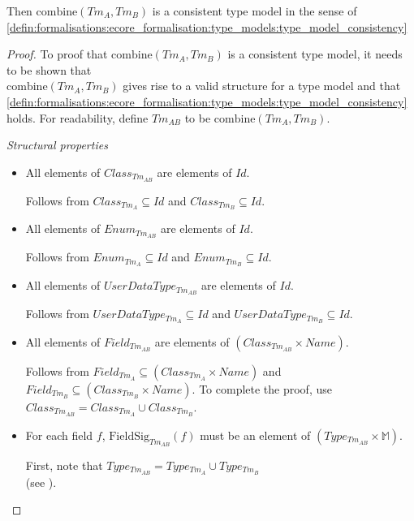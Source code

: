 \begin{thm}
Then $\mathrm{combine}(Tm_A, Tm_B)$ is a consistent type model in the sense of \cref{defin:formalisations:ecore_formalisation:type_models:type_model_consistency}
\end{thm}

\begin{proof}
To proof that $\mathrm{combine}(Tm_A, Tm_B)$ is a consistent type model, it needs to be shown that\\ $\mathrm{combine}(Tm_A, Tm_B)$ gives rise to a valid structure for a type model and that \cref{defin:formalisations:ecore_formalisation:type_models:type_model_consistency} holds. For readability, define $Tm_{AB}$ to be $\mathrm{combine}(Tm_A, Tm_B)$.

\emph{Structural properties}
\begin{itemize}
    \item All elements of $Class_{Tm_{AB}}$ are elements of $Id$.
    
    Follows from $Class_{Tm_A} \subseteq Id$ and $Class_{Tm_B} \subseteq Id$.
    
    
    \item All elements of $Enum_{Tm_{AB}}$ are elements of $Id$.
    
    Follows from $Enum_{Tm_A} \subseteq Id$ and $Enum_{Tm_B} \subseteq Id$.
    
    
    \item All elements of $UserDataType_{Tm_{AB}}$ are elements of $Id$.
    
    Follows from $UserDataType_{Tm_A} \subseteq Id$ and $UserDataType_{Tm_B} \subseteq Id$.
    
    
    \item All elements of $Field_{Tm_{AB}}$ are elements of $(Class_{Tm_{AB}} \times Name)$.
    
    Follows from $Field_{Tm_A} \subseteq (Class_{Tm_A} \times Name)$ and $Field_{Tm_B} \subseteq (Class_{Tm_B} \times Name)$. To complete the proof, use $Class_{Tm_{AB}} = Class_{Tm_A} \cup Class_{Tm_B}$.
    
    
    \item For each field $f$, $\mathrm{FieldSig}_{Tm_{AB}}(f)$ must be an element of $(Type_{Tm_{AB}} \times \mathbb{M})$.
    
    First, note that $Type_{Tm_{AB}} = Type_{Tm_A} \cup Type_{Tm_B}$\\(see ).
    

\end{itemize}
\end{proof}
